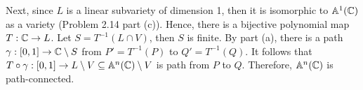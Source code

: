 \begin{solution}
\begin{enumerate}
        Next, since $L$ is a linear subvariety of dimension 1, then it is isomorphic to $\mathbb{A}^1(\mathbb{C})$ as a variety (Problem 2.14 part (c)). Hence, there is a bijective polynomial map $T : \mathbb{C} \to L$. Let $S = T^{-1}(L \cap V)$, then $S$ is finite. By part (a), there is a path $\gamma : [0,1] \to \mathbb{C}\setminus S$ from $P' = T^{-1}(P)$ to $Q' = T^{-1}(Q)$. It follows that $T \circ \gamma : [0,1] \to L \setminus V \subseteq \mathbb{A}^n(\mathbb{C})\setminus V$ is path from $P$ to $Q$. Therefore, $\mathbb{A}^n(\mathbb{C})$ is path-connected. \\
    \end{enumerate}
\end{solution}